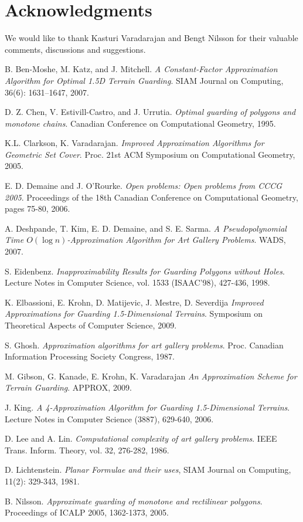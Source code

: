 \documentclass[11pt]{article}
\begin{document}
\section*{Acknowledgments}
We would like to thank Kasturi Varadarajan and Bengt Nilsson for their valuable comments, discussions and suggestions.





\newpage

\begin{thebibliography}{99}
 B. Ben-Moshe, M. Katz, and J. Mitchell. {\em A Constant-Factor Approximation Algorithm for Optimal 1.5D Terrain Guarding}. SIAM Journal on Computing, 36(6): 1631--1647, 2007.

 D. Z. Chen, V. Estivill-Castro, and J. Urrutia. {\em Optimal guarding of polygons and monotone chains}. Canadian Conference on Computational Geometry, 1995.

 K.L. Clarkson, K. Varadarajan. {\em Improved Approximation Algorithms for Geometric Set Cover}. Proc. 21st ACM Symposium on Computational Geometry, 2005.

 E. D. Demaine and J. O’Rourke. {\em Open problems: Open problems from CCCG 2005}. Proceedings of
the 18th Canadian Conference on Computational Geometry, pages 75-80, 2006.

 A. Deshpande, T. Kim, E. D. Demaine, and S. E. Sarma. {\em A Pseudopolynomial Time $O(\log n)$-Approximation Algorithm for Art Gallery Problems}. WADS, 2007.

 S. Eidenbenz. {\em Inapproximability Results for Guarding Polygons without Holes}. Lecture Notes in Computer Science, vol. 1533 (ISAAC'98), 427-436, 1998.

 K. Elbassioni, E. Krohn, D. Matijevic, J. Mestre, D. Severdija {\em Improved Approximations for Guarding 1.5-Dimensional Terrains}. Symposium on Theoretical Aspects of Computer Science, 2009.

 S. Ghosh. {\em Approximation algorithms for art gallery problems}. Proc. Canadian Information Processing Society Congress, 1987.

 M. Gibson, G. Kanade, E. Krohn, K. Varadarajan {\em  An Approximation Scheme for Terrain Guarding}. APPROX, 2009.

 J. King. {\em A 4-Approximation Algorithm for Guarding 1.5-Dimensional Terrains}. Lecture Notes in Computer Science (3887), 629-640, 2006.

 D. Lee and A. Lin. {\em Computational complexity of art gallery problems}. IEEE Trans. Inform. Theory, vol. 32, 276-282, 1986.

 D. Lichtenstein. {\em Planar Formulae and their uses}, SIAM Journal on Computing, 11(2): 329-343, 1981.

 B. Nilsson. {\em Approximate guarding of monotone and rectilinear polygons}. Proceedings of ICALP 2005, 1362-1373, 2005.

\end{thebibliography}
\end{document}
